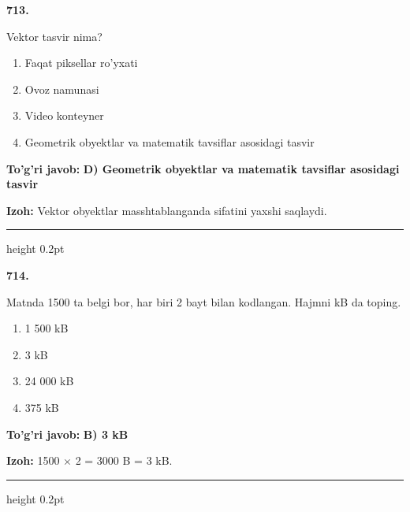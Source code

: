 \documentclass[10pt,a4paper,oneside]{article}
\begin{document}
\noindent\textbf{\color{ink}713.}
\par
Vektor tasvir nima?
\begin{enumerate}[label=\Alph*),leftmargin=9mm]
\item Faqat piksellar ro'yxati
\item Ovoz namunasi
\item Video konteyner
\item Geometrik obyektlar va matematik tavsiflar asosidagi tasvir
\end{enumerate}
\begin{tcolorbox}[enhanced,breakable,colback=teal!4,colframe=teal!50!black,boxrule=0.5pt,arc=1.1mm,left=3mm,right=3mm,top=1.7mm,bottom=1.7mm,before skip=2mm,after skip=2mm]
\textbf{\color{teal}To'g'ri javob:} \textbf{D) Geometrik obyektlar va matematik tavsiflar asosidagi tasvir}
\par\smallskip
\textbf{Izoh:} Vektor obyektlar masshtablanganda sifatini yaxshi saqlaydi.
\end{tcolorbox}
\vspace{2mm}\hrule height 0.2pt \vspace{3mm}

\noindent\textbf{\color{ink}714.}
\par
Matnda 1500 ta belgi bor, har biri 2 bayt bilan kodlangan. Hajmni kB da toping.
\begin{enumerate}[label=\Alph*),leftmargin=9mm]
\item 1 500 kB
\item 3 kB
\item 24 000 kB
\item 375 kB
\end{enumerate}
\begin{tcolorbox}[enhanced,breakable,colback=teal!4,colframe=teal!50!black,boxrule=0.5pt,arc=1.1mm,left=3mm,right=3mm,top=1.7mm,bottom=1.7mm,before skip=2mm,after skip=2mm]
\textbf{\color{teal}To'g'ri javob:} \textbf{B) 3 kB}
\par\smallskip
\textbf{Izoh:} 1500 \ensuremath{\times} 2 = 3000 B = 3 kB.
\end{tcolorbox}
\vspace{2mm}\hrule height 0.2pt \vspace{3mm}
\end{document}
